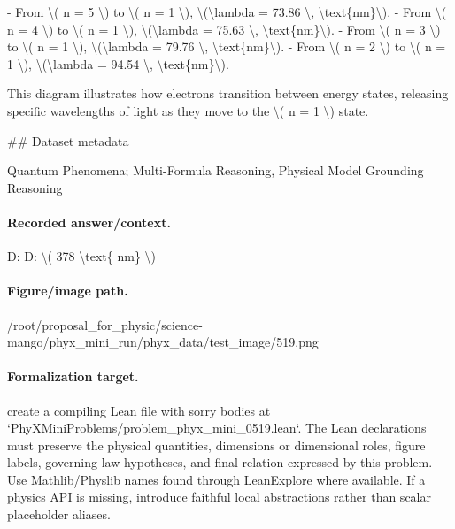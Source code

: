 - From \textbackslash{}( n = 5 \textbackslash{}) to \textbackslash{}( n = 1 \textbackslash{}), \textbackslash{}(\textbackslash{}lambda = 73.86 \textbackslash{}, \textbackslash{}text\{nm\}\textbackslash{}).
- From \textbackslash{}( n = 4 \textbackslash{}) to \textbackslash{}( n = 1 \textbackslash{}), \textbackslash{}(\textbackslash{}lambda = 75.63 \textbackslash{}, \textbackslash{}text\{nm\}\textbackslash{}).
- From \textbackslash{}( n = 3 \textbackslash{}) to \textbackslash{}( n = 1 \textbackslash{}), \textbackslash{}(\textbackslash{}lambda = 79.76 \textbackslash{}, \textbackslash{}text\{nm\}\textbackslash{}).
- From \textbackslash{}( n = 2 \textbackslash{}) to \textbackslash{}( n = 1 \textbackslash{}), \textbackslash{}(\textbackslash{}lambda = 94.54 \textbackslash{}, \textbackslash{}text\{nm\}\textbackslash{}).

This diagram illustrates how electrons transition between energy states, releasing specific wavelengths of light as they move to the \textbackslash{}( n = 1 \textbackslash{}) state.

\#\# Dataset metadata

Quantum Phenomena; Multi-Formula Reasoning, Physical Model Grounding Reasoning

\paragraph{Recorded answer/context.}
D: D: \textbackslash{}( 378 \textbackslash{}text\{ nm\} \textbackslash{})

\paragraph{Figure/image path.}
/root/proposal\_for\_physic/science-mango/phyx\_mini\_run/phyx\_data/test\_image/519.png

\paragraph{Formalization target.}
create a compiling Lean file with sorry bodies at `PhyXMiniProblems/problem\_phyx\_mini\_0519.lean`. The Lean declarations must preserve the physical quantities, dimensions or dimensional roles, figure labels, governing-law hypotheses, and final relation expressed by this problem.
Use Mathlib/Physlib names found through LeanExplore where available. If a physics API is missing, introduce faithful local abstractions rather than scalar placeholder aliases.

